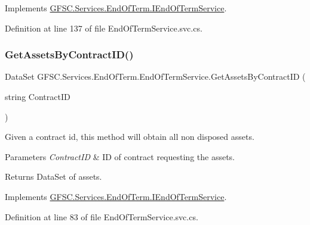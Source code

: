Implements \mbox{\hyperlink{interface_g_f_s_c_1_1_services_1_1_end_of_term_1_1_i_end_of_term_service_a42b75253cee04256fc3160d3c3765373}{G\+F\+S\+C.\+Services.\+End\+Of\+Term.\+I\+End\+Of\+Term\+Service}}.



Definition at line 137 of file End\+Of\+Term\+Service.\+svc.\+cs.

\mbox{\label{class_g_f_s_c_1_1_services_1_1_end_of_term_1_1_end_of_term_service_aeff0831ea8a5b34217f8f85cf0d3d0db}} 
\subsubsection{\texorpdfstring{Get\+Assets\+By\+Contract\+I\+D()}{GetAssetsByContractID()}}
{\footnotesize\ttfamily Data\+Set G\+F\+S\+C.\+Services.\+End\+Of\+Term.\+End\+Of\+Term\+Service.\+Get\+Assets\+By\+Contract\+ID (\begin{DoxyParamCaption}\item[{string}]{Contract\+ID }\end{DoxyParamCaption})}



Given a contract id, this method will obtain all non disposed assets. 


\begin{DoxyParams}{Parameters}
{\em Contract\+ID} & ID of contract requesting the assets.\\
\hline
\end{DoxyParams}
\begin{DoxyReturn}{Returns}
Data\+Set of assets.
\end{DoxyReturn}


Implements \mbox{\hyperlink{interface_g_f_s_c_1_1_services_1_1_end_of_term_1_1_i_end_of_term_service_a84c0cb4ce184d91111f0116efa36132f}{G\+F\+S\+C.\+Services.\+End\+Of\+Term.\+I\+End\+Of\+Term\+Service}}.



Definition at line 83 of file End\+Of\+Term\+Service.\+svc.\+cs.

